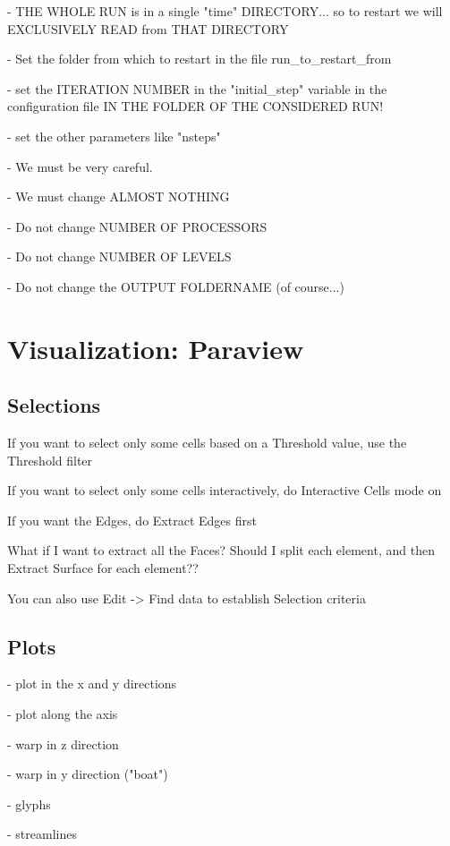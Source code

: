 \documentclass[10pt]{book}
\begin{document}
- THE WHOLE RUN is in a single "time" DIRECTORY...
  so to restart we will EXCLUSIVELY READ from THAT DIRECTORY

- Set the folder from which to restart in the file run\_to\_restart\_from

- set the ITERATION NUMBER in the "initial\_step" variable in the configuration file IN THE FOLDER OF THE CONSIDERED RUN!

- set the other parameters like "nsteps"


- We must be very careful.

- We must change ALMOST NOTHING

- Do not change NUMBER OF PROCESSORS

- Do not change NUMBER OF LEVELS

- Do not change the OUTPUT FOLDERNAME (of course...)



\part{Visualization: Paraview}


\chapter{Selections}


 If you want to select only some cells based on a Threshold value, use the Threshold filter

 If you want to select only some cells interactively, do Interactive Cells mode on
 
 If you want the Edges, do Extract Edges first
 
 What if I want to extract all the Faces? 
   Should I split each element, and then Extract Surface for each element??

 You can also use Edit -> Find data to establish Selection criteria
 
 
 \chapter{Plots}
 
- plot in the x and y directions

- plot along the axis

- warp in z direction

- warp in y direction ("boat")

- glyphs

- streamlines
\end{document}
